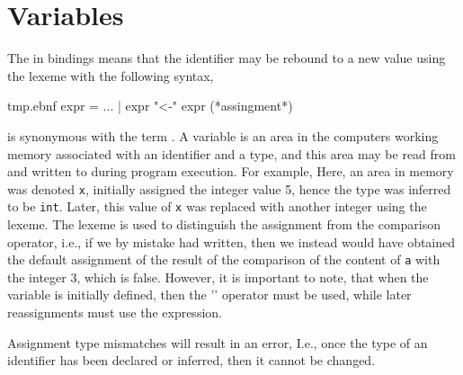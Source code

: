 \section{Variables}
\label{sec:mutableValues}
The  in  bindings means that the identifier may be rebound to a new value using the \idx{\lexeme{<-}} lexeme with the following syntax,
%
\begin{verbatimwrite}{tmp.ebnf}
expr = ...
  | expr "<-" expr (*assingment*)
\end{verbatimwrite}
%
 is synonymous with the term . A variable is an area in the computers working memory associated with an identifier and a type, and this area may be read from and written to during program execution. For example,
%
%
Here, an area in memory was denoted \texttt{x}, initially assigned the integer value 5, hence the type was inferred to be \lstinline|int|.  Later, this value of \texttt{x} was replaced with another integer using the \idx{\lexeme{<-}} lexeme. The \lexeme{<-} lexeme is used to distinguish the assignment from the comparison operator, i.e., if we by mistake had written,
%
%
%
then we instead would have obtained the default assignment of the result of the comparison of the content of \lstinline|a| with the integer 3, which is false. However, it is important to note, that when the variable is initially defined, then the '\lexeme{=}' operator must be used, while later reassignments must use the \lexeme{<-} expression.

Assignment type mismatches will result in an error, 
%
%
I.e., once the type of an identifier has been declared or inferred, then it cannot be changed.


